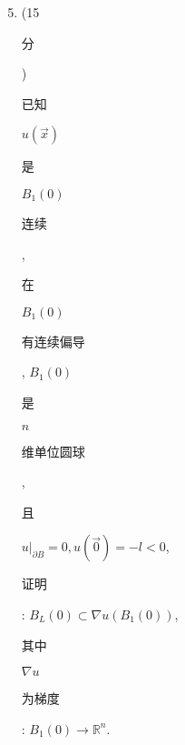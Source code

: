 \documentclass[10pt]{article}
\begin{document}
\begin{enumerate}
  \setcounter{enumi}{4}
  \item (15 \begin{CJK}{UTF8}{mj}分\end{CJK}) \begin{CJK}{UTF8}{mj}已知\end{CJK} $u(\vec{x})$ \begin{CJK}{UTF8}{mj}是\end{CJK} $B_{1}(0)$ \begin{CJK}{UTF8}{mj}连续\end{CJK}, \begin{CJK}{UTF8}{mj}在\end{CJK} $B_{1}(0)$ \begin{CJK}{UTF8}{mj}有连续偏导\end{CJK}, $B_{1}(0)$ \begin{CJK}{UTF8}{mj}是\end{CJK} $n$ \begin{CJK}{UTF8}{mj}维单位圆球\end{CJK}, \begin{CJK}{UTF8}{mj}且\end{CJK} $\left.u\right|_{\partial B}=0, u(\overrightarrow{0})=-l<0$, \begin{CJK}{UTF8}{mj}证明\end{CJK}: $B_{L}(0) \subset \nabla u\left(B_{1}(0)\right)$, \begin{CJK}{UTF8}{mj}其中\end{CJK} $\nabla u$ \begin{CJK}{UTF8}{mj}为梯度\end{CJK}: $B_{1}(0) \rightarrow \mathbb{R}^{n}$.


\end{enumerate}
\end{document}
